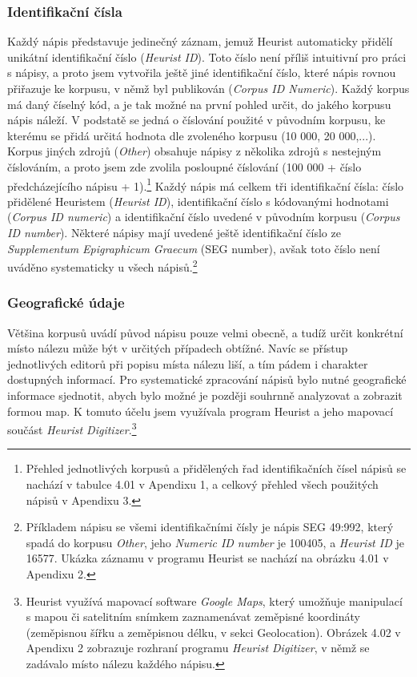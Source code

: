 \subsubsection[identifikační-čísla]{Identifikační čísla}

Každý nápis představuje jedinečný záznam, jemuž Heurist automaticky přidělí unikátní identifikační číslo ({\em Heurist ID}). Toto číslo není příliš intuitivní pro práci s nápisy, a proto jsem vytvořila ještě jiné identifikační číslo, které nápis rovnou přiřazuje ke korpusu, v němž byl publikován ({\em Corpus ID Numeric}). Každý korpus má daný číselný kód, a je tak možné na první pohled určit, do jakého korpusu nápis náleží. V podstatě se jedná o číslování použité v původním korpusu, ke kterému se přidá určitá hodnota dle zvoleného korpusu (10 000, 20 000,...). Korpus jiných zdrojů ({\em Other}) obsahuje nápisy z několika zdrojů s nestejným číslováním, a proto jsem zde zvolila posloupné číslování (100 000 + číslo předcházejícího nápisu + 1).\footnote{Přehled jednotlivých korpusů a přidělených řad identifikačních čísel nápisů se nachází v tabulce 4.01 v Apendixu 1, a celkový přehled všech použitých nápisů v Apendixu 3.} Každý nápis má celkem tři identifikační čísla: číslo přidělené Heuristem ({\em Heurist ID}), identifikační číslo s kódovanými hodnotami ({\em Corpus ID numeric}) a identifikační číslo uvedené v původním korpusu ({\em Corpus ID number}). Některé nápisy mají uvedené ještě identifikační číslo ze {\em Supplementum Epigraphicum Graecum} (SEG number), avšak toto číslo není uváděno systematicky u všech nápisů.\footnote{Příkladem nápisu se všemi identifikačními čísly je nápis SEG 49:992, který spadá do korpusu {\em Other}, jeho {\em Numeric ID number} je 100405, a {\em Heurist ID} je 16577. Ukázka záznamu v programu Heurist se nachází na obrázku 4.01 v Apendixu 2.}

\subsubsection[geografické-údaje]{Geografické údaje}

Většina korpusů uvádí původ nápisu pouze velmi obecně, a tudíž určit konkrétní místo nálezu může být v určitých případech obtížné. Navíc se přístup jednotlivých editorů při popisu místa nálezu liší, a tím pádem i charakter dostupných informací. Pro systematické zpracování nápisů bylo nutné geografické informace sjednotit, abych bylo možné je později souhrnně analyzovat a zobrazit formou map. K tomuto účelu jsem využívala program Heurist a jeho mapovací součást {\em Heurist Digitizer}.\footnote{Heurist využívá mapovací software {\em Google Maps}, který umožňuje manipulací s mapou či satelitním snímkem zaznamenávat zeměpisné koordináty (zeměpisnou šířku a zeměpisnou délku, v sekci Geolocation). Obrázek 4.02 v Apendixu 2 zobrazuje rozhraní programu {\em Heurist Digitizer}, v němž se zadávalo místo nálezu každého nápisu.}

